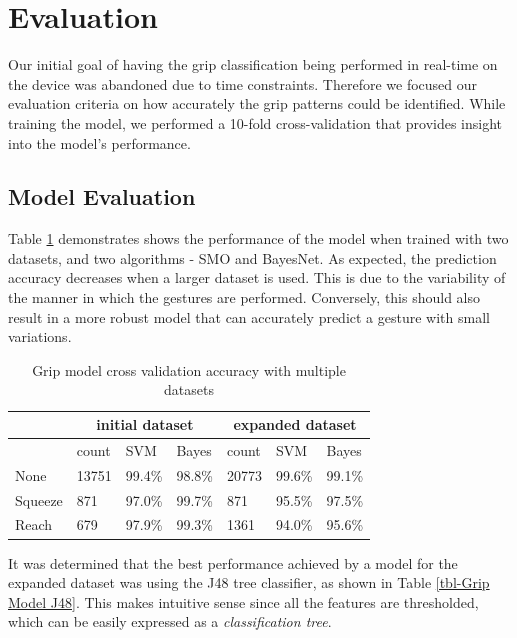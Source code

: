 \section{Evaluation}
Our initial goal of having the grip classification being performed in real-time on the device was abandoned due to time constraints. Therefore we focused our evaluation criteria on how accurately the grip patterns could be identified. While training the model, we performed a 10-fold cross-validation that provides insight into the model's performance.

\subsection{Model Evaluation}
Table \ref{tbl-Grip Model Eval} demonstrates shows the performance of the model when trained with two datasets, and two algorithms - SMO and BayesNet. As expected, the prediction accuracy decreases when a larger dataset is used. This is due to the variability of the manner in which the gestures are performed. Conversely, this should also result in a more robust model that can accurately predict a gesture with small variations.

\begin{table}[!t]
\caption{Grip model cross validation accuracy with multiple datasets}
\label{tbl-Grip Model Eval}
\begin{tabular}{|l||l|l|l|l|l|l|}\hline
        & \multicolumn{3}{c|}{initial dataset} & \multicolumn{3}{c|}{expanded dataset} \\ \hline \hline
        & count     & SVM        & Bayes      & count     & SVM        & Bayes    \\
None    & 13751     & 99.4\%     & 98.8\%     & 20773     & 99.6\%     & 99.1\%      \\
Squeeze & 871       & 97.0\%     & 99.7\%     & 871       & 95.5\%     & 97.5\%      \\
Reach   & 679       & 97.9\%     & 99.3\%     & 1361      & 94.0\%     & 95.6\%    \\ \hline
\end{tabular}
\end{table}

It was determined that the best performance achieved by a model for the expanded dataset was using the J48 tree classifier, as shown in  Table \ref{tbl-Grip Model J48}. This makes intuitive sense since all the features are thresholded, which can be easily expressed as a \textit{classification tree}.

